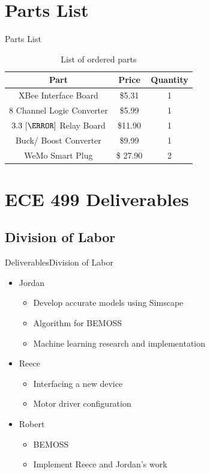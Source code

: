\documentclass{beamer}
\begin{document}

\section{Parts List}

\begin{frame}{Parts List}{}
  \begin{table}
\centering
\begin{tabular}{|c|c|c|}
    \hline
    Part & Price & Quantity \\
    \hline 
    XBee Interface Board & \$5.31 & 1 \\
    \hline
    8 Channel Logic Converter & \$5.99 & 1 \\
    \hline
    $3.3~[\volt]$ Relay Board & \$11.90 & 1\\
    \hline 
    Buck/ Boost Converter & \$9.99 & 1\\
    \hline 
    WeMo Smart Plug & \$ 27.90 & 2\\
    \hline
\end{tabular}
\caption{List of ordered parts}
\label{tab:ordparts}
\end{table}
\end{frame}


\section{ECE 499 Deliverables}

\subsection{Division of Labor}
\begin{frame}{Deliverables}{Division of Labor}
  \begin{itemize}
      \item Jordan 
      \begin{itemize}
          \item Develop accurate models using Simscape
          \item Algorithm for BEMOSS
          \item Machine learning research and implementation
      \end{itemize}
      \item Reece
      \begin{itemize}
          \item Interfacing a new device
          \item Motor driver configuration
      \end{itemize}
      \item Robert
      \begin{itemize}
          \item BEMOSS 
          \item Implement Reece and Jordan's work
      \end{itemize}
  \end{itemize}


\end{frame}
\end{document}

